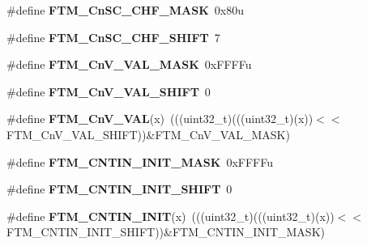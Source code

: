 \begin{DoxyCompactItemize}
\item 
\#define {\bfseries F\+T\+M\+\_\+\+Cn\+S\+C\+\_\+\+C\+H\+F\+\_\+\+M\+A\+SK}~0x80u\hypertarget{group__FTM__Register__Masks_ga16fe13e36069f8d764bbb9bad111001f}{}\label{group__FTM__Register__Masks_ga16fe13e36069f8d764bbb9bad111001f}

\item 
\#define {\bfseries F\+T\+M\+\_\+\+Cn\+S\+C\+\_\+\+C\+H\+F\+\_\+\+S\+H\+I\+FT}~7\hypertarget{group__FTM__Register__Masks_gad3f83c62029e371ae120c576015212bb}{}\label{group__FTM__Register__Masks_gad3f83c62029e371ae120c576015212bb}

\item 
\#define {\bfseries F\+T\+M\+\_\+\+Cn\+V\+\_\+\+V\+A\+L\+\_\+\+M\+A\+SK}~0x\+F\+F\+F\+Fu\hypertarget{group__FTM__Register__Masks_gaebf50ac59c7cc0b853a2a90b117ac395}{}\label{group__FTM__Register__Masks_gaebf50ac59c7cc0b853a2a90b117ac395}

\item 
\#define {\bfseries F\+T\+M\+\_\+\+Cn\+V\+\_\+\+V\+A\+L\+\_\+\+S\+H\+I\+FT}~0\hypertarget{group__FTM__Register__Masks_ga763735cc078e7480124e33026ff2fa22}{}\label{group__FTM__Register__Masks_ga763735cc078e7480124e33026ff2fa22}

\item 
\#define {\bfseries F\+T\+M\+\_\+\+Cn\+V\+\_\+\+V\+AL}(x)~(((uint32\+\_\+t)(((uint32\+\_\+t)(x))$<$$<$F\+T\+M\+\_\+\+Cn\+V\+\_\+\+V\+A\+L\+\_\+\+S\+H\+I\+FT))\&F\+T\+M\+\_\+\+Cn\+V\+\_\+\+V\+A\+L\+\_\+\+M\+A\+SK)\hypertarget{group__FTM__Register__Masks_gaee6cacf155d736fa3c12612eae539dca}{}\label{group__FTM__Register__Masks_gaee6cacf155d736fa3c12612eae539dca}

\item 
\#define {\bfseries F\+T\+M\+\_\+\+C\+N\+T\+I\+N\+\_\+\+I\+N\+I\+T\+\_\+\+M\+A\+SK}~0x\+F\+F\+F\+Fu\hypertarget{group__FTM__Register__Masks_ga5181f522d645ce312209c2258a1a06d0}{}\label{group__FTM__Register__Masks_ga5181f522d645ce312209c2258a1a06d0}

\item 
\#define {\bfseries F\+T\+M\+\_\+\+C\+N\+T\+I\+N\+\_\+\+I\+N\+I\+T\+\_\+\+S\+H\+I\+FT}~0\hypertarget{group__FTM__Register__Masks_ga174caa0423e0d00ae66b8adc3253ce60}{}\label{group__FTM__Register__Masks_ga174caa0423e0d00ae66b8adc3253ce60}

\item 
\#define {\bfseries F\+T\+M\+\_\+\+C\+N\+T\+I\+N\+\_\+\+I\+N\+IT}(x)~(((uint32\+\_\+t)(((uint32\+\_\+t)(x))$<$$<$F\+T\+M\+\_\+\+C\+N\+T\+I\+N\+\_\+\+I\+N\+I\+T\+\_\+\+S\+H\+I\+FT))\&F\+T\+M\+\_\+\+C\+N\+T\+I\+N\+\_\+\+I\+N\+I\+T\+\_\+\+M\+A\+SK)\hypertarget{group__FTM__Register__Masks_gac20c0ad9416a41d291b1fed2313da2ea}{}\label{group__FTM__Register__Masks_gac20c0ad9416a41d291b1fed2313da2ea}


\end{DoxyCompactItemize}
